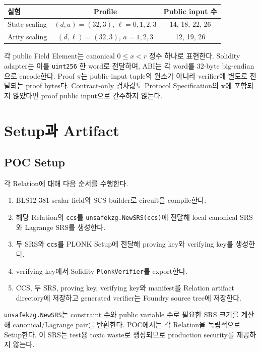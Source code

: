 \documentclass[11pt,a4paper]{extarticle}
\begin{document}
\begin{center}
\begin{tabular}{l|c|c}
\toprule
실험 & Profile & Public input 수 \\
\midrule
State scaling & $(d,a)=(32,3)$, $\ell=0,1,2,3$ & 14, 18, 22, 26 \\
Arity scaling & $(d,\ell)=(32,3)$, $a=1,2,3$ & 12, 19, 26 \\
\bottomrule
\end{tabular}
\end{center}

각 public Field Element는 canonical $0\leq x<r$ 정수 하나로 표현한다. Solidity
adapter는 이를 \texttt{uint256} 한 word로 전달하며, ABI는 각 word를 32-byte
big-endian으로 encode한다. Proof $\pi$는 public input tuple의 원소가 아니라 verifier에
별도로 전달되는 proof bytes다. Contract-only 검사값도 Protocol Specification의
$\mathbf{x}$에 포함되지 않았다면 proof public input으로 간주하지 않는다.

\section{Setup과 Artifact}

\subsection{POC Setup}

각 Relation에 대해 다음 순서를 수행한다.

\begin{enumerate}
  \item BLS12-381 scalar field와 SCS builder로 circuit을 compile한다.
  \item 해당 Relation의 \texttt{ccs}를 \texttt{unsafekzg.NewSRS(ccs)}에 전달해
        local canonical SRS와 Lagrange SRS를 생성한다.
  \item 두 SRS와 \texttt{ccs}를 PLONK Setup에 전달해 proving key와 verifying key를 생성한다.
  \item verifying key에서 Solidity \texttt{PlonkVerifier}를 export한다.
  \item CCS, 두 SRS, proving key, verifying key와 manifest를 Relation artifact
        directory에 저장하고 generated verifier는 Foundry source tree에 저장한다.
\end{enumerate}

\texttt{unsafekzg.NewSRS}는 constraint 수와 public variable 수로 필요한 SRS 크기를
계산해 canonical/Lagrange pair를 반환한다. POC에서는 각 Relation을 독립적으로 Setup한다.
이 SRS는 test용 toxic waste로 생성되므로 production security를 제공하지 않는다.
\end{document}
